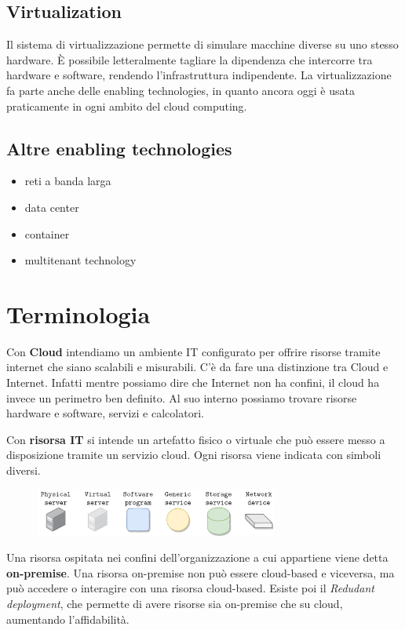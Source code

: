 \subsection{Virtualization}
Il sistema di virtualizzazione permette di simulare macchine diverse su uno stesso hardware. È possibile letteralmente tagliare la dipendenza che intercorre tra hardware e software, rendendo l'infrastruttura indipendente. La virtualizzazione fa parte anche delle enabling technologies, in quanto ancora oggi è usata praticamente in ogni ambito del cloud computing.

\subsection{Altre enabling technologies}
\begin{itemize}
    \item reti a banda larga
    \item data center
    \item container
    \item multitenant technology
\end{itemize}
\break

\section{Terminologia}
Con \textbf{Cloud} intendiamo un ambiente IT configurato per offrire risorse tramite internet che siano scalabili e misurabili. C'è da fare una distinzione tra Cloud e Internet. Infatti mentre possiamo dire che Internet non ha confini, il cloud ha invece un perimetro ben definito. Al suo interno possiamo trovare risorse hardware e software, servizi e calcolatori.

\vspace{5mm}

Con \textbf{risorsa IT} si intende un artefatto fisico o virtuale che può essere messo a disposizione tramite un servizio cloud. Ogni risorsa viene indicata con simboli diversi.

\begin{figure}[ht]
    \centering
    \includegraphics[width=8cm]{./Images/cap2/2.3.png}
    \label{fig:image2.3}
\end{figure}

Una risorsa ospitata nei confini dell'organizzazione a cui appartiene viene detta \textbf{on-premise}. Una risorsa on-premise non può essere cloud-based e viceversa, ma può accedere o interagire con una risorsa cloud-based. Esiste poi il \textit{Redudant deployment}, che permette di avere risorse sia on-premise che su cloud, aumentando l'affidabilità.

